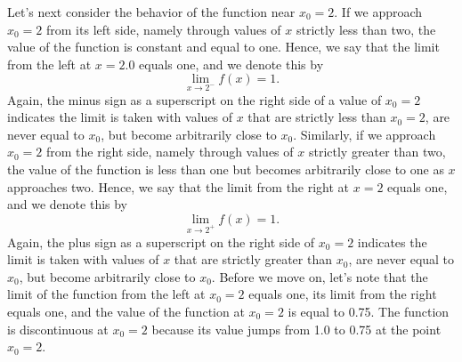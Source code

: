 Let's next consider the behavior of the function near $x_0=2$.  If we approach $x_0=2$ from its left side, namely through values of $x$ strictly less than two, the value of the function is constant and equal to one. Hence, we say that the limit from the left at $x=2.0$ equals one, and we denote this by
\begin{equation}
    \lim_{x \to 2^-} f(x) = 1.
\end{equation}
Again, the minus sign as a superscript on the right side of a value of $x_0=2$ indicates the limit is taken with values of $x$ that are strictly less than $x_0=2$, are never equal to $x_0$, but become arbitrarily close to $x_0$.
Similarly, if we approach $x_0=2$ from the right side, namely through values of $x$ strictly greater than two, the value of the function is less than one but becomes arbitrarily close to one as $x$ approaches two. Hence, we say that the limit from the right at $x=2$ equals one, and we denote this by
\begin{equation}
    \lim_{x \to 2^+} f(x) = 1.
\end{equation}
Again, the plus sign as a superscript on the right side of $x_0=2$ indicates the limit is taken with values of $x$ that are strictly greater than $x_0$, are never equal to $x_0$, but become arbitrarily close to $x_0$. Before we move on, let's note that the limit of the function from the left at $x_0=2$ equals one, its limit from the right equals one, and the value of the function at $x_0=2$ is equal to 0.75. The function is discontinuous at $x_0=2$ because its value jumps from 1.0 to 0.75 at the point $x_0=2$. 

